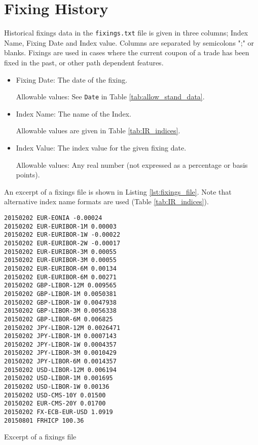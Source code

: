 \section{Fixing History}\label{sec:fixings}
Historical fixings data in the {\tt fixings.txt} file is given in three columns; Index Name, Fixing Date and Index
value. Columns are separated by semicolons ";" or blanks. Fixings are used in cases where the current coupon of a trade
has been fixed in the past, or other path dependent features.

\begin{itemize}

\item Fixing Date: The date of the fixing.  

Allowable values:  See \lstinline!Date! in Table \ref{tab:allow_stand_data}.

\item Index Name: The name of the Index. 

  Allowable values are given in Table \ref{tab:IR_indices}. %

\item Index Value: The index value for the given fixing
  date. 

  Allowable values: Any real number (not expressed as a percentage or basis points).
\end{itemize}

An excerpt of a fixings file is shown in Listing \ref{lst:fixings_file}. Note that alternative index name formats are
used (Table \ref{tab:IR_indices}).

\begin{listing}[H]
\begin{verbatim}
20150202 EUR-EONIA -0.00024
20150202 EUR-EURIBOR-1M 0.00003
20150202 EUR-EURIBOR-1W -0.00022
20150202 EUR-EURIBOR-2W -0.00017
20150202 EUR-EURIBOR-3M 0.00055
20150202 EUR-EURIBOR-3M 0.00055
20150202 EUR-EURIBOR-6M 0.00134
20150202 EUR-EURIBOR-6M 0.00271
20150202 GBP-LIBOR-12M 0.009565
20150202 GBP-LIBOR-1M 0.0050381
20150202 GBP-LIBOR-1W 0.0047938
20150202 GBP-LIBOR-3M 0.0056338
20150202 GBP-LIBOR-6M 0.006825
20150202 JPY-LIBOR-12M 0.0026471
20150202 JPY-LIBOR-1M 0.0007143
20150202 JPY-LIBOR-1W 0.0004357
20150202 JPY-LIBOR-3M 0.0010429
20150202 JPY-LIBOR-6M 0.0014357
20150202 USD-LIBOR-12M 0.006194
20150202 USD-LIBOR-1M 0.001695
20150202 USD-LIBOR-1W 0.00136
20150202 USD-CMS-10Y 0.01500
20150202 EUR-CMS-20Y 0.01700
20150202 FX-ECB-EUR-USD 1.0919
20150801 FRHICP 100.36
\end{verbatim}
\caption{Excerpt of a fixings file}
\label{lst:fixings_file}  
\end{listing}

